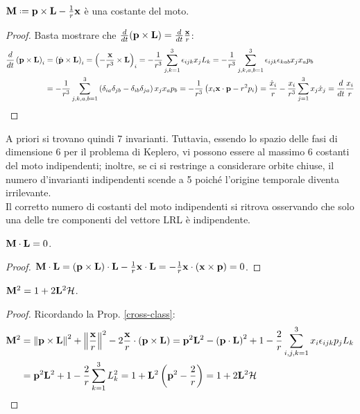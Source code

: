 \begin{proposition}
	$ \ve{M} \defeq \ve{p} \times \ve{L} - \frac{1}{r} \ve{x} $ è una costante del moto.
\end{proposition}
\begin{proof}
	Basta mostrare che $ \frac{d}{dt} (\mathbf{p} \times \mathbf{L}) = \frac{d}{dt} \frac{\mathbf{x}}{r} $:
	\begin{equation*}
		\begin{split}
			\frac{d}{dt} \left( \mathbf{p} \times \mathbf{L} \right)_i
			&= \left( \dot{\mathbf{p}} \times \mathbf{L} \right)_i = \left( -\frac{\mathbf{x}}{r^3} \times \mathbf{L} \right)_i = - \frac{1}{r^3} \sum_{j,k = 1}^{3} \epsilon_{ijk} x_j L_k = - \frac{1}{r^3} \sum_{j,k,a,b = 1}^{3} \epsilon_{ijk} \epsilon_{kab} x_j x_a p_b \\
			&= - \frac{1}{r^3} \sum_{j,k,a,b = 1}^{3} \left( \delta_{ia} \delta_{jb} - \delta_{ib} \delta_{ja} \right) x_j x_a p_b = - \frac{1}{r^3} \left( x_i \mathbf{x} \cdot \mathbf{p} - r^2 p_i \right) = \frac{\dot{x}_i}{r} - \frac{x_i}{r^3} \sum_{j = 1}^{3} x_j \dot{x}_j = \frac{d}{dt} \frac{x_i}{r}
		\end{split}
	\end{equation*}
\end{proof}

A priori si trovano quindi 7 invarianti. Tuttavia, essendo lo spazio delle fasi di dimensione 6 per il problema di Keplero, vi possono essere al massimo 6 costanti del moto indipendenti; inoltre, se ci si restringe a considerare orbite chiuse, il numero d'invarianti indipendenti scende a 5 poiché l'origine temporale diventa irrilevante.\\
Il corretto numero di costanti del moto indipendenti si ritrova osservando che solo una delle tre componenti del vettore LRL è indipendente.

\begin{proposition}
	$ \mathbf{M} \cdot \mathbf{L} = 0 $.
\end{proposition}
\begin{proof}
	$ \mathbf{M} \cdot \mathbf{L} = (\mathbf{p} \times \mathbf{L}) \cdot \mathbf{L} - \frac{1}{r} \mathbf{x} \cdot \mathbf{L} = - \frac{1}{r} \mathbf{x} \cdot (\mathbf{x} \times \mathbf{p}) = 0 $.
\end{proof}

\begin{proposition}
	$ \mathbf{M}^2 = 1 + 2 \mathbf{L}^2 \mathcal{H} $.
\end{proposition}
\begin{proof}
	Ricordando la Prop. \ref{cross-class}:
	\begin{equation*}
		\begin{split}
			\mathbf{M}^2
			&= \left\lVert\mathbf{p} \times \mathbf{L}\right\rVert^2 + \left\lVert\frac{\mathbf{x}}{r}\right\rVert^2 - 2 \frac{\mathbf{x}}{r} \cdot \left( \mathbf{p} \times \mathbf{L} \right) = \mathbf{p}^2 \mathbf{L}^2 - \left( \mathbf{p} \cdot \mathbf{L} \right)^2 + 1 - \frac{2}{r} \sum_{i,j,k = 1}^{3} x_i \epsilon_{ijk} p_j L_k \\
			&= \mathbf{p}^2 \mathbf{L}^2 + 1 - \frac{2}{r} \sum_{k = 1}^{3} L_k^2 = 1 + \mathbf{L}^2 \left( \mathbf{p}^2 - \frac{2}{r} \right) = 1 + 2 \mathbf{L}^2 \mathcal{H}
		\end{split}
	\end{equation*}
\end{proof}

